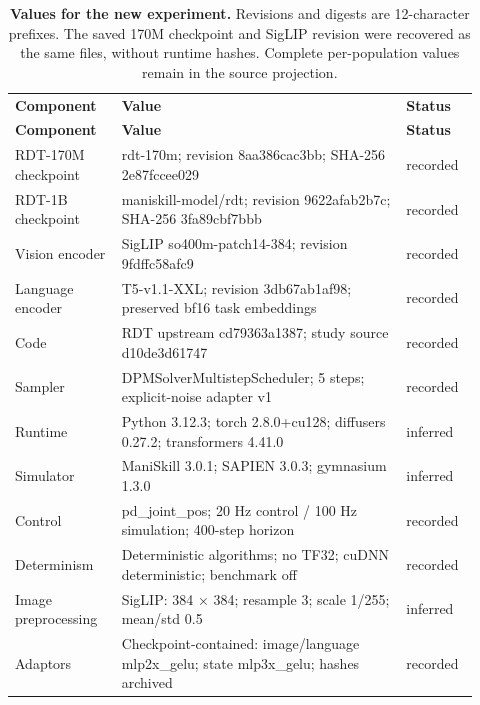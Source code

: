 \setlength{\tabcolsep}{2pt}
\begin{longtable}{p{0.210\linewidth} p{0.570\linewidth} p{0.140\linewidth}}
\noalign{\addtocounter{table}{-1}}
\caption*{\textbf{Values for the new experiment.} Revisions and digests are 12-character prefixes. The saved 170M checkpoint and SigLIP revision were recovered as the same files, without runtime hashes. Complete per-population values remain in the source projection.}\\
\toprule
\textbf{Component} & \textbf{Value} & \textbf{Status} \\
\midrule\endfirsthead
\toprule
\textbf{Component} & \textbf{Value} & \textbf{Status} \\
\midrule\endhead
\bottomrule\endfoot
RDT-170M checkpoint & rdt-170m; revision 8aa386cac3bb; SHA-256 2e87fccee029 & recorded \\
RDT-1B checkpoint & maniskill-model/rdt; revision 9622afab2b7c; SHA-256 3fa89cbf7bbb & recorded \\
Vision encoder & SigLIP so400m-patch14-384; revision 9fdffc58afc9 & recorded \\
Language encoder & T5-v1.1-XXL; revision 3db67ab1af98; preserved bf16 task embeddings & recorded \\
Code & RDT upstream cd79363a1387; study source d10de3d61747 & recorded \\
Sampler & DPMSolverMultistepScheduler; 5 steps; explicit-noise adapter v1 & recorded \\
Runtime & Python 3.12.3; torch 2.8.0+cu128; diffusers 0.27.2; transformers 4.41.0 & inferred \\
Simulator & ManiSkill 3.0.1; SAPIEN 3.0.3; gymnasium 1.3.0 & inferred \\
Control & pd\_joint\_pos; 20 Hz control / 100 Hz simulation; 400-step horizon & recorded \\
Determinism & Deterministic algorithms; no TF32; cuDNN deterministic; benchmark off & recorded \\
Image preprocessing & SigLIP: 384 × 384; resample 3; scale 1/255; mean/std 0.5 & inferred \\
Adaptors & Checkpoint-contained: image/language mlp2x\_gelu; state mlp3x\_gelu; hashes archived & recorded \\
\end{longtable}
